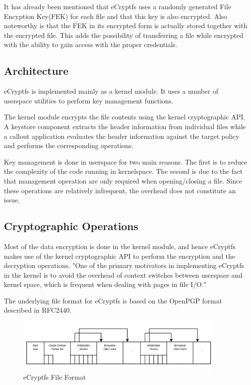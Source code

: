 It has already been mentioned that eCryptfs uses a randomly generated File Encyption Key(FEK) for each file and that this key is also encrypted. Also noteworthy is that the FEK in its encrypted form is actually stored together with the encrypted file. This adds the possibility of transferring a file while encrypted with the ability to gain access with the proper credentials.

\subsection{Architecture}
\label{sub-sec:arch-ecryptfs}

eCryptfs is implemented mainly as a kernel module. It uses a number of userspace utilities to perform key management functions.


The kernel module encrypts the file contents using the kernel cryptographic API. A keystore component extracts the header information from individual files while a callout application evaluates the header information against the target policy and performs the corresponding operations.

Key management is done in userspace for two main reasons. The first is to reduce the complexity of the code running in kernelspace. The second is due to the fact that management operation are only required when opening/closing a file. Since these operations are relatively infrequent, the overhead does not constitute an issue.

\subsection{Cryptographic Operations}
\label{sub-sec:crypt-ops-ecryptfs}

Most of the data encryption is done in the kernel module, and hence eCryptfs makes use of the kernel cryptographic API to perform the encryption and the decryption operations. "One of the primary motivators in implementing eCryptfs in the kernel is to avoid the overhead of context switches between userspace and kernel space, which is frequent when dealing with pages in file I/O\cite{ecryptfs-paper}."

The underlying file format for eCryptfs is based on the OpenPGP format described in RFC2440\cite{rfc}.

\begin{figure}[h!]
\centering
    \includegraphics[width=0.92\textwidth]{src/img/ecryptfs/fileformat.png}
\caption{eCryptfs File Format\cite{ecryptfs-paper}}
\end{figure}


